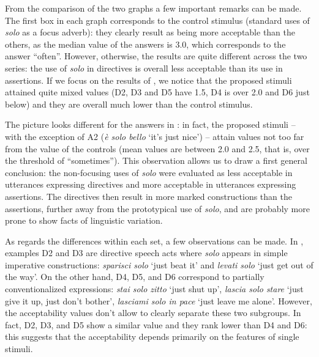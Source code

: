 From\largerpage{} the comparison of the two graphs a few important remarks can be made. The first box in each graph corresponds to the control stimulus (standard uses of \textit{solo} as a focus adverb): they clearly result as being more acceptable than the others, as the median value of the answers is 3.0, which corresponds to the answer “often”. However, otherwise, the results are quite different across the two series: the use of \textit{solo} in directives is overall less acceptable than its use in assertions. If we focus on the results of , we notice that the proposed stimuli attained quite mixed values (D2, D3 and D5 have 1.5, D4 is over 2.0 and D6 just below) and they are overall much lower than the control stimulus.

The picture looks different for the answers in : in fact, the proposed stimuli – with the exception of A2 (\textit{è solo bello} ‘it’s just nice’) – attain values not too far from the value of the controls (mean values are between 2.0 and 2.5, that is, over the threshold of “sometimes”). This observation allows us to draw a first general conclusion: the non-focusing uses of \textit{solo} were evaluated as less acceptable in utterances expressing directives and more acceptable in utterances expressing assertions. The directives then result in more marked constructions than the assertions, further away from the prototypical use of \textit{solo}, and are probably more prone to show facts of linguistic variation.

As regards the differences within each set, a few observations can be made. In , examples D2 and D3 are directive speech acts where \textit{solo} appears in simple imperative constructions: \textit{sparisci solo} ‘just beat it’ and \textit{levati solo} ‘just get out of the way’. On the other hand, D4, D5, and D6 correspond to partially conventionalized expressions: \textit{stai solo zitto} ‘just shut up’, \textit{lascia solo stare} ‘just give it up, just don’t bother’, \textit{lasciami solo in pace} ‘just leave me alone’. However, the acceptability values don’t allow to clearly separate these two subgroups. In fact, D2, D3, and D5 show a similar value and they rank lower than D4 and D6: this suggests that the acceptability depends primarily on the features of single stimuli.

